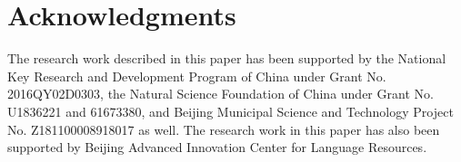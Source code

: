 \documentclass[letterpaper]{article} %
\begin{document}
\section{ Acknowledgments}
The research work described in this paper has been supported by the National Key Research and Development Program of China under Grant No. 2016QY02D0303, the Natural Science Foundation of China under Grant No. U1836221 and 61673380, and Beijing Municipal Science and Technology Project No. Z181100008918017 as well. The research work in this paper has also been supported by Beijing Advanced Innovation Center for Language Resources.

 

\end{document}
